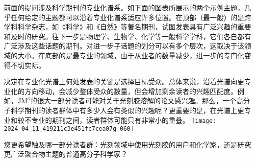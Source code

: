 前面的提问涉及科学期刊的专业化谱系。如下面的图表所展示的两个示例主题，几乎任何给定的主题都可以沿着专业化谱系适应许多位置。在顶部（最一般）的是跨学科科学杂志，如《科学》和《自然》等著名期刊，试图发表具有广泛兴趣的重要和及时的研究。往下一步是物理学、生物学、化学等一般科学学科，它们各自都有广泛涉及这些话题的期刊。对进一步子话题的划分可以有多个层次，这取决于该领域的大小。在底部的是最专业的领域，由于从业者的数量减少，进一步的专门化变得不切实际。

决定在专业化光谱上何处发表的关键是选择目标受众。总体来说，沿着光谱向更专业化的方向移动，会减少整体受众的数量，但会增加剩余读者的兴趣匹配度。例如，$\mathrm{JM}^{3}$的很大一部分读者可能对关于光刻胶溶解的论文感兴趣。那么，一个高分子科学期刊的读者群体中有多少人会有类似的兴趣呢？更重要的是，在光谱上更专业和较不专业的期刊之间，读者群体可能只有非常小的重叠。
\texttt{[image: 2024\_04\_11\_419211c3e451fc7cea07g-060]}

您更希望触及哪一部分读者群：光刻领域中使用光刻胶的用户和化学家，还是研究更广泛聚合物主题的普通高分子科学家？

